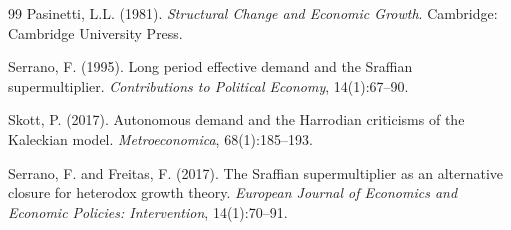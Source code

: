 \documentclass[12pt, a4paper]{article}
\theoremstyle{definition}
\theoremstyle{remark}
\begin{document}
\begin{thebibliography}{99}
Pasinetti, L.L. (1981). \emph{Structural Change and Economic Growth}. Cambridge: Cambridge University Press.

Serrano, F. (1995). Long period effective demand and the Sraffian supermultiplier. \emph{Contributions to Political Economy}, 14(1):67--90.

Skott, P. (2017). Autonomous demand and the Harrodian criticisms of the Kaleckian model. \emph{Metroeconomica}, 68(1):185--193.

Serrano, F. and Freitas, F. (2017). The Sraffian supermultiplier as an alternative closure for heterodox growth theory. \emph{European Journal of Economics and Economic Policies: Intervention}, 14(1):70--91.

\end{thebibliography}
\end{document}
